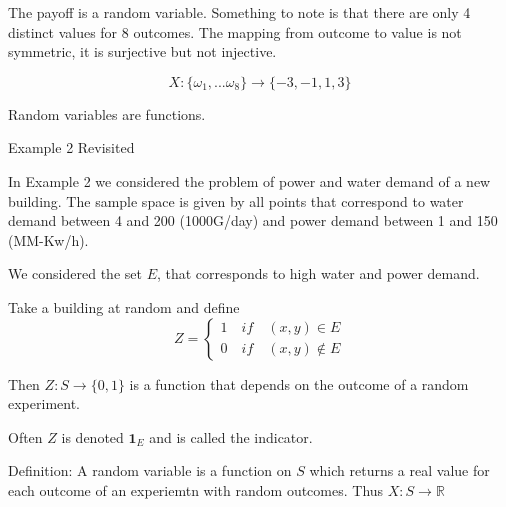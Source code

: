 \documentclass{report}
\begin{document}
\begin{description}
\begin{mdframed}
            The payoff is a random variable. Something to note
            is that there are only 4 distinct values for 8 outcomes.
            The mapping from outcome to value is not symmetric, it
            is surjective but not injective.

            \begin{displaymath}
                X : \{\omega_1, ... \omega_8\} \to \{-3, -1, 1, 3\} 
            \end{displaymath}
            
            Random variables are functions.
        \end{mdframed}

    \item {\large Example 2 Revisited}
        \begin{mdframed}
            In Example 2 we considered the problem of power
            and water demand of a new building. The sample
            space is given by all points that correspond to
            water demand between 4 and 200 (1000G/day) and power
            demand between 1 and 150 (MM-Kw/h).

            We considered the set $E$, that corresponds to high
            water and power demand.

            Take a building at random and define
             \begin{displaymath}
                Z =  
                \begin{cases}
                    1 \quad if \quad (x,y) \in E\\ 
                    0  \quad if \quad (x,y) \notin E
                \end{cases}
            \end{displaymath}
            
            Then $Z: S \to \{0, 1\}$ is a function that depends
            on the outcome of a random experiment.

             \begin{mdframed}
                Often $Z$ is denoted
                $\mathbf{1}_E$ and is called the
                indicator.
            \end{mdframed}

            \vspace{10}

            Definition: A random variable is a function on $S$
            which returns a real value for each outcome of an
            experiemtn with random outcomes. Thus $X: S \to \mathbb{R}$


\end{mdframed}
\end{description}
\end{document}
